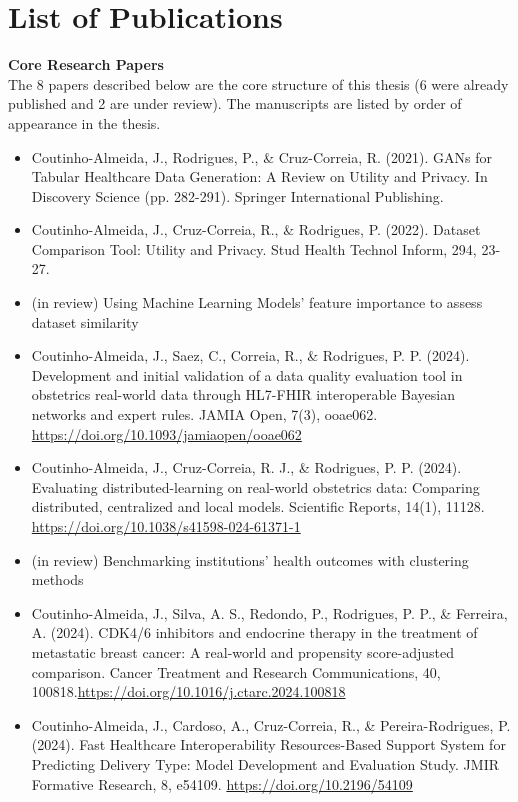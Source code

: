 \chapter*{List of Publications}



\textbf{Core Research Papers} \\
The 8 papers described below are the core structure of this thesis (6 were already published and 2 are under review). The manuscripts are listed by order of appearance in the thesis.
\\
\begin{itemize}
    \item Coutinho-Almeida, J., Rodrigues, P., \& Cruz-Correia, R. (2021). GANs for Tabular Healthcare Data Generation: A Review on Utility and Privacy. In Discovery Science (pp. 282-291). Springer International Publishing.

    \item Coutinho-Almeida, J., Cruz-Correia, R., \& Rodrigues, P. (2022). Dataset Comparison Tool: Utility and Privacy. Stud Health Technol Inform, 294, 23-27.
    

    \item (in review) Using Machine Learning Models' feature importance to assess dataset similarity 


    \item Coutinho-Almeida, J., Saez, C., Correia, R., \& Rodrigues, P. P. (2024). Development and initial validation of a data quality evaluation tool in obstetrics real-world data through HL7-FHIR interoperable Bayesian networks and expert rules. JAMIA Open, 7(3), ooae062. \url{https://doi.org/10.1093/jamiaopen/ooae062}

    
    \item Coutinho-Almeida, J., Cruz-Correia, R. J., \& Rodrigues, P. P. (2024). Evaluating distributed-learning on real-world obstetrics data: Comparing distributed, centralized and local models. Scientific Reports, 14(1), 11128. \url{https://doi.org/10.1038/s41598-024-61371-1}

    
    \item (in review) Benchmarking institutions' health outcomes with clustering methods 

    
    \item Coutinho-Almeida, J., Silva, A. S., Redondo, P., Rodrigues, P. P., \& Ferreira, A. (2024). CDK4/6 inhibitors and endocrine therapy in the treatment of metastatic breast cancer: A real-world and propensity score-adjusted comparison. Cancer Treatment and Research Communications, 40, 100818.\url{https://doi.org/10.1016/j.ctarc.2024.100818}
    
    \item Coutinho-Almeida, J., Cardoso, A., Cruz-Correia, R., \& Pereira-Rodrigues, P. (2024). Fast Healthcare Interoperability Resources-Based Support System for Predicting Delivery Type: Model Development and Evaluation Study. JMIR Formative Research, 8, e54109. \url{https://doi.org/10.2196/54109}

\end{itemize}



